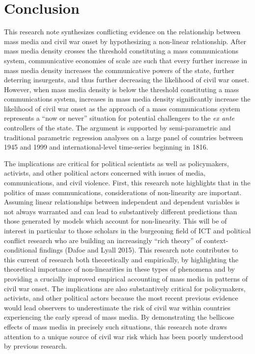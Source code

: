 \documentclass[11pt,article,oneside]{memoir}
\begin{document}
\section{Conclusion}\label{conclusion}

This research note synthesizes conflicting evidence on the relationship
between mass media and civil war onset by hypothesizing a non-linear
relationship. After mass media density crosses the threshold
constituting a mass communications system, communicative economies of
scale are such that every further increase in mass media density
increases the communicative powers of the state, further deterring
insurgents, and thus further decreasing the likelihood of civil war
onset. However, when mass media density is below the threshold
constituting a mass communications system, increases in mass media
density significantly increase the likelihood of civil war onset as the
approach of a mass communications system represents a ``now or never''
situation for potential challengers to the \emph{ex ante} controllers of
the state. The argument is supported by semi-parametric and traditional
parametric regression analyses on a large panel of countries between
1945 and 1999 and international-level time-series beginning in 1816.

The implications are critical for political scientists as well as
policymakers, activists, and other political actors concerned with
issues of media, communications, and civil violence. First, this
research note highlights that in the politics of mass communications,
considerations of non-linearity are important. Assuming linear
relationships between independent and dependent variables is not always
warranted and can lead to substantively different predictions than those
generated by models which account for non-linearity. This will be of
interest in particular to those scholars in the burgeoning field of ICT
and political conflict research who are building an increasingly ``rich
theory'' of context-conditional findings (Dafoe and Lyall 2015). This
research note contributes to this current of research both theoretically
and empirically, by highlighting the theoretical importance of
non-linearities in these types of phenomena and by providing a crucially
improved empirical accounting of mass media in patterns of civil war
onset. The implications are also substantively critical for
policymakers, activists, and other political actors because the most
recent previous evidence would lead observers to underestimate the risk
of civil war within countries experiencing the early spread of mass
media. By demonstrating the bellicose effects of mass media in precisely
such situations, this research note draws attention to a unique source
of civil war risk which has been poorly understood by previous research.
\end{document}
